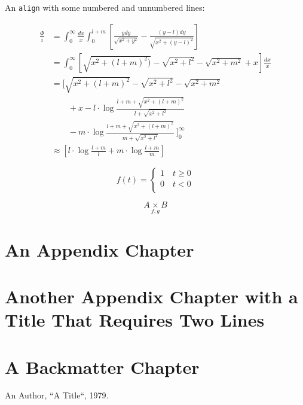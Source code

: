 \documentclass[a4paper,11pt,oneside,showtrims]{alpenthesis}
\begin{document}
An \verb|align| with some numbered and unnumbered lines:

\begin{align}
    \frac{\Phi}{i}
    & =
    \int_{0}^{\infty} \frac{dx}{x} \int_{0}^{l+m}
    \left[
        \frac{y dy}{\sqrt{x^2+y^2}} - \frac{(y-l) dy}{\sqrt{x^2+(y-l)^2}}
    \right]
    \nonumber
    \\
    &=
    \int_{0}^{\infty}
    \left[
        \sqrt{x^2 + (l+m)^2)} - \sqrt{x^2+l^2} - \sqrt{x^2+m^2}+x
    \right]
    \frac{dx}{x}
    \nonumber
    \\
    &=
    \Bigg[
        \sqrt{x^2 + (l+m)^2} - \sqrt{x^2+l^2} - \sqrt{x^2+m^2}
        \nonumber
        \\
        & ~~~~~~~~~   + x - l \cdot \log{\frac{l+m+\sqrt{x^2+(l+m)^2}}{l+\sqrt{x^2+l^2}}}
        \nonumber
        \\
        & ~~~~~~~~~   - m \cdot \log{\frac{l+m+\sqrt{x^2+(l+m)^2}}{m+\sqrt{x^2+l^2}}} ~
    \Bigg]_0^{\infty}
    \label{eq:mISL:2}
    \\
    & \approx
    \left[ l \cdot \log{\frac{l+m}{l}} + m \cdot \log{\frac{l+m}{m}} \right]
    \label{eq:mISL:3}
\end{align}

\begin{equation}
    f(t) =
    \begin{cases}
        1 \quad t \geq 0\\
        0 \quad t < 0\\
    \end{cases}
\end{equation}

\begin{equation}
    A \underset{f,g}{\times} B
\end{equation}

\cleardoublepage
\begin{titlingpage*}
    \begin{vplace}
        \flushright\Huge\bfseries\sffamily\appendixpagename
    \end{vplace}
\end{titlingpage*}
\appendix
{}
\chapter{An Appendix Chapter}
\lipsum[1-3]

\chapter{Another Appendix Chapter with a Title That Requires Two Lines}
\lipsum[4-6]

\backmatter
\chapter{A Backmatter Chapter}
\lipsum[7-9]

\begin{thebibliography}{1}
        An Author, ``A Title``, 1979.
\end{thebibliography}
\end{document}
